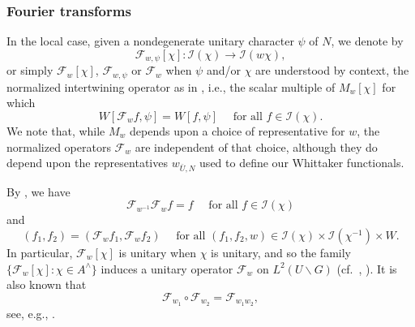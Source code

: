 \subsubsection{Fourier transforms}\label{sec:fourier-transforms}
In the local case, given a nondegenerate unitary character $\psi$ of $N$, we denote by 
\begin{equation*}
  \mathcal{F}_{w,\psi}[\chi] : \mathcal{I}(\chi) \rightarrow \mathcal{I}(w \chi),
\end{equation*}
or simply $\mathcal{F}_{w}[\chi]$, $\mathcal{F}_{w,\psi}$ or $\mathcal{F}_w$ when $\psi$ and/or $\chi$ are understood by context, the normalized intertwining operator as in \cite[p336]{MR610479}, i.e., the scalar multiple of $M_w[\chi]$ for which
\begin{equation}\label{eq:wmathcalf_w-fchi-psi}
  W[\mathcal{F}_w f, \psi] = W[f,\psi] \quad \text{ for all } f \in \mathcal{I}(\chi).
\end{equation}
We note that, while $M_w$ depends upon a choice of representative for $w$, the normalized operators $\mathcal{F}_{w}$ are independent of that choice, although they do depend upon the representatives $w_{\bar{U},N}$ used to define our Whittaker functionals.

By \cite[Prop 3.1.4]{MR610479}, we have
\begin{equation}\label{eq:mathc-1-mathc}
  \mathcal{F}_{w^{-1}} \mathcal{F}_w  f = f
  \quad \text{ for all } f \in \mathcal{I}(\chi)
\end{equation}
and
\begin{equation}\label{eq:f_1chi-f_2chi-1}
  (f_1, f_2) =
  (\mathcal{F}_w f_1, \mathcal{F}_w f_2)
  \quad
  \text{ for all } (f_1,f_2,w) \in \mathcal{I}(\chi) \times \mathcal{I}(\chi^{-1}) \times W.
\end{equation}
In particular, $\mathcal{F}_w[\chi]$ is unitary when $\chi$ is unitary, and so the family $\{\mathcal{F}_w[\chi] : \chi \in A^\wedge \}$ induces a unitary operator $\mathcal{F}_w$ on $L^2(U \backslash G)$ (cf.\ \cite[\S3.5]{MR3468638}, \cite{MR1694894,MR1988971,MR3969881}).  It is also known that
\begin{equation*}
  \mathcal{F}_{w_1} \circ \mathcal{F}_{w_2} = \mathcal{F}_{w_1 w_2},
\end{equation*}
see, e.g., \cite[Thm 2.1, $(R_2)$]{MR999488}.

